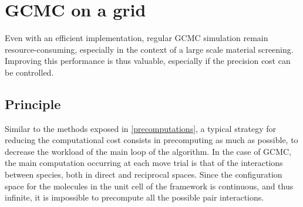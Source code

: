 \documentclass[main.tex]{subfiles}
\begin{document}
\section{GCMC on a grid}

Even with an efficient implementation, regular GCMC simulation remain resource-consuming, especially in the context of a large scale material screening. Improving this performance is thus valuable, especially if the precision cost can be controlled.

\subsection{Principle}

Similar to the methods exposed in \cref{precomputations}, a typical strategy for reducing the computational cost consists in precomputing as much as possible, to decrease the workload of the main loop of the algorithm. In the case of GCMC, the main computation occurring at each move trial is that of the interactions between species, both in direct and reciprocal spaces. Since the configuration space for the molecules in the unit cell of the framework is continuous, and thus infinite, it is impossible to precompute all the possible pair interactions.
\end{document}
